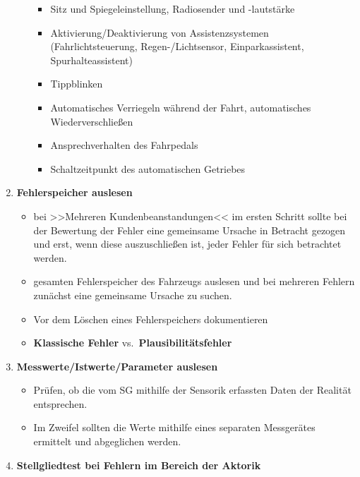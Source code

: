 \begin{enumerate}
\begin{itemize}
    \begin{itemize}
    \item
      Sitz und Spiegeleinstellung, Radiosender und -lautstärke
    \item
      Aktivierung/Deaktivierung von Assistenzsystemen
      (Fahrlichtsteuerung, Regen-/Lichtsensor, Einparkassistent,
      Spurhalteassistent)
    \item
      Tippblinken
    \item
      Automatisches Verriegeln während der Fahrt, automatisches
      Wiederverschließen
    \item
      Ansprechverhalten des Fahrpedals
    \item
      Schaltzeitpunkt des automatischen Getriebes
    \end{itemize}
  \end{itemize}
\item
  \textbf{Fehlerspeicher auslesen}

  \begin{itemize}
  \item
    bei >>Mehreren Kundenbeanstandungen<< im ersten Schritt sollte bei
    der Bewertung der Fehler eine gemeinsame Ursache in Betracht gezogen
    und erst, wenn diese auszuschließen ist, jeder Fehler für sich
    betrachtet werden.
  \item
    gesamten Fehlerspeicher des Fahrzeugs auslesen und bei mehreren
    Fehlern zunächst eine gemeinsame Ursache zu suchen.
  \item
    Vor dem Löschen eines Fehlerspeichers dokumentieren
  \item
    \textbf{Klassische Fehler} vs.~\textbf{Plausibilitätsfehler}
  \end{itemize}
\item
  \textbf{Messwerte/Istwerte/Parameter auslesen}

  \begin{itemize}
  \item
    Prüfen, ob die vom SG mithilfe der Sensorik erfassten Daten der
    Realität entsprechen.
  \item
    Im Zweifel sollten die Werte mithilfe eines separaten Messgerätes
    ermittelt und abgeglichen werden.
  \end{itemize}
\item
  \textbf{Stellgliedtest bei Fehlern im Bereich der Aktorik}


\end{enumerate}
